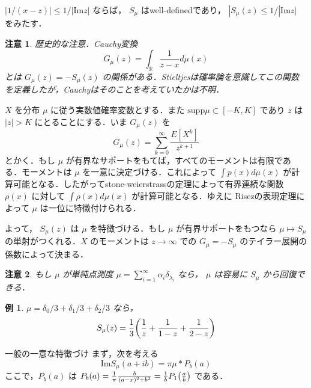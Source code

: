 \documentclass{ltjsarticle}
\theoremstyle{mystyle1}
\theoremstyle{mystyle2}
\newtheorem{example}{例}
\newtheorem{note*}{注意}
\theoremstyle{mystyle3}
\begin{document}
$|1/(x-z)|\leq1/|\mathrm{Im}z|$ ならば， $S_\mu$ はwell-definedであり， $|S_\mu(z)\leq 1/|\mathrm{Im}z|$ をみたす．

\begin{note*}
    歴史的な注意．Cauchy変換
    \begin{equation}
        G_\mu(z)=\int_\mathbb{R}\frac{1}{z-x}d\mu(x)
    \end{equation}
    とは $G_\mu(z)=-S_\mu(z)$ の関係がある．Stieltjesは確率論を意識してこの関数を定義したが，Cauchyはそのことを考えていたかは不明．
\end{note*}

$X$ を分布 $\mu$ に従う実数値確率変数とする．また $\mathrm{supp}\mu\subset [-K,K]$ であり $z$ は $|z|>K$ にとることにする．いま $G_\mu(z)$ を
\begin{equation}
    G_\mu(z)=\sum_{k=0}^\infty\frac{E[X^k]}{z^{k+1}}
\end{equation}
とかく．もし $\mu$ が有界なサポートをもてば，すべてのモーメントは有限である．モーメントは $\mu$ を一意に決定づける．これによって $\int p(x)d\mu(x)$ が計算可能となる．したがってstone-weierstrassの定理によって有界連続な関数 $\rho(x)$ に対して $\int\rho(x)d\mu(x)$ が計算可能となる．ゆえに Risezの表現定理によって $\mu$ は一位に特徴付けられる．

よって， $S_\mu(z)$ は $\mu$ を特徴づける．もし $\mu$ が有界サポートをもつなら $\mu\mapsto S_\mu$ の単射がつくれる．$X$ のモーメントは $z\to\infty$ での $G_\mu=-S_\mu$ のテイラー展開の係数によって決まる．

\begin{note*}
    もし $\mu$ が単純点測度 $\mu=\sum_{i=1}^\infty \alpha_i\delta_{\lambda_i}$ なら， $\mu$ は容易に $S_\mu$ から回復できる．
\end{note*}

\begin{example}
    $\mu=\delta_0/3+\delta_1/3+\delta_2/3$ なら，
    \begin{equation}
        S_\mu(z)=\frac{1}{3}\mleft(\frac{1}{z}+\frac{1}{1-z}+\frac{1}{2-z}\mright)
    \end{equation}
\end{example}

一般の一意な特徴づけ
まず，次を考える
\begin{equation}
    \mathrm{Im} S_\mu(a+ib)=\pi\mu * P_b(a)
\end{equation}
ここで，$P_b(a)$ は $P_b(a)=\frac{1}{\pi}\frac{b}{(a-x)^2+b^2}=\frac{1}{b}P_1\mleft(\frac{a}{b}\mright)$ である．
\end{document}
